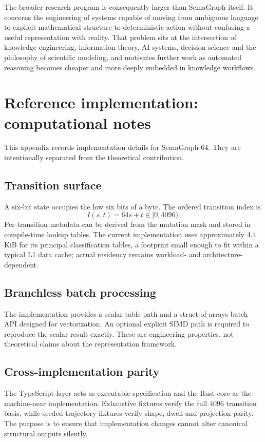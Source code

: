 \documentclass[11pt,a4paper]{article}
\begin{document}
The broader research program is consequently larger than SemaGraph itself. It concerns the engineering of systems capable of moving from ambiguous language to explicit mathematical structure to deterministic action without confusing a useful representation with reality. That problem sits at the intersection of knowledge engineering, information theory, AI systems, decision science and the philosophy of scientific modeling, and motivates further work as automated reasoning becomes cheaper and more deeply embedded in knowledge workflows.

\appendix
\section{Reference implementation: computational notes}
This appendix records implementation details for SemaGraph-64. They are intentionally separated from the theoretical contribution.

\subsection{Transition surface}
A six-bit state occupies the low six bits of a byte. The ordered transition index is
\begin{equation}
I(s,t)=64s+t\in[0,4096).
\end{equation}
Per-transition metadata can be derived from the mutation mask and stored in compile-time lookup tables. The current implementation uses approximately 4.4 KiB for its principal classification tables, a footprint small enough to fit within a typical L1 data cache; actual residency remains workload- and architecture-dependent.

\subsection{Branchless batch processing}
The implementation provides a scalar table path and a struct-of-arrays batch API designed for vectorization. An optional explicit SIMD path is required to reproduce the scalar result exactly. These are engineering properties, not theoretical claims about the representation framework.

\subsection{Cross-implementation parity}
The TypeScript layer acts as executable specification and the Rust core as the machine-near implementation. Exhaustive fixtures verify the full $4096$ transition basis, while seeded trajectory fixtures verify shape, dwell and projection parity. The purpose is to ensure that implementation changes cannot alter canonical structural outputs silently.
\end{document}
